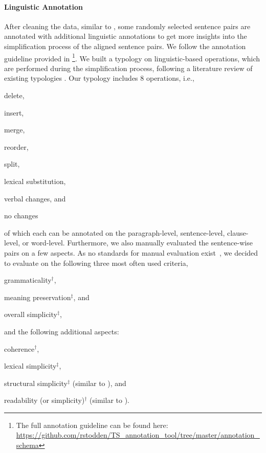 \documentclass[11pt]{article}
\begin{document}
\paragraph{Linguistic Annotation}
After cleaning the data, similar to \cite{cardon-etal-2022-linguistic}, 
some randomly selected sentence pairs are annotated with additional linguistic annotations to get more insights into the simplification process of the aligned sentence pairs. We follow the annotation guideline provided in \citet{stodden-kallmeyer-2022-ts}\footnote{The full annotation guideline can be found here: \url{https://github.com/rstodden/TS_annotation_tool/tree/master/annotation_schema}}. We built a typology on linguistic-based operations, which are performed during the simplification process, following a literature review of existing typologies \citet{bott-saggion-2014-text,brunato-etal-2015-design,gonzalez-dios-etal-2018-corpus,koptient-etal-2019-simplification}. Our typology includes 8 operations, i.e., 
\begin{enumerate*}[label=\roman*)]
    \item delete,
    \item insert,
    \item merge,
    \item reorder,
    \item split,
    \item lexical substitution,
    \item verbal changes, and
    \item no changes
\end{enumerate*}
of which each can be annotated on the paragraph-level, sentence-level, clause-level, or word-level. Furthermore, we also manually evaluated the sentence-wise pairs on a few aspects. As no standards for manual evaluation exist~\cite{alva-manchego-etal-2020-data}, we decided to evaluate on the following three most often used criteria, 
\begin{enumerate*} [label=\roman*)]
    \item grammaticality$^\dagger$, 
    \item meaning preservation$^\ddagger$, and  
    \item overall simplicity$^\ddagger$,
\end{enumerate*} and the following additional aspects:
\begin{enumerate*}[label=\roman*)]
    \setcounter{enumi}{3}
    \item coherence$^\dagger$, 
    \item lexical simplicity$^\ddagger$,
    \item structural simplicity$^\ddagger$ (similar to \citet{sulem-etal-2018-semantic}), and
    \item readability (or simplicity)$^\dagger$ (similar to \citet{brunato-etal-2018-sentence}).
\end{enumerate*} 
\end{document}
